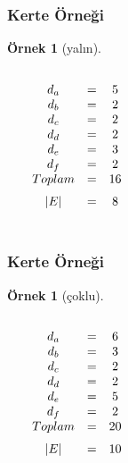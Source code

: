 \documentclass[dvipsnames]{beamer}
\theoremstyle{definition}
\theoremstyle{example}
\newtheorem{ornek}[theorem]{Örnek}
\theoremstyle{plain}
\begin{document}
\begin{frame}
  \frametitle{Kerte Örneği}

  \begin{ornek}[yalın]
    \begin{columns}
      \begin{center}
      \end{center}

      $\begin{array}{ccc}
      d_a & = & 5\\
      d_b & = & 2\\
      d_c & = & 2\\
      d_d & = & 2\\
      d_e & = & 3\\
      d_f & = & 2\\
      \medskip
      Toplam & = & 16\\
      \medskip
      |E| & = & 8
      \end{array}$
    \end{columns}
  \end{ornek}
\end{frame}

\begin{frame}
  \frametitle{Kerte Örneği}

  \begin{ornek}[çoklu]
    \begin{columns}
      \begin{center}
      \end{center}

      $\begin{array}{ccc}
      d_a & = & 6\\
      d_b & = & 3\\
      d_c & = & 2\\
      d_d & = & 2\\
      d_e & = & 5\\
      d_f & = & 2\\
      \medskip
      Toplam & = & 20\\
      \medskip
      |E| & = & 10
      \end{array}$
    \end{columns}
  \end{ornek}
\end{frame}
\end{document}
